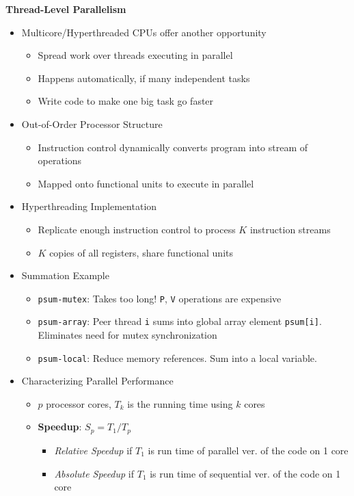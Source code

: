 \documentclass[12pt]{article}
\newcommand{\cname}[1]{\large \textbf{#1}}
\begin{document}
{\cname{Thread-Level Parallelism}
\begin{itemize}
	\item Multicore/Hyperthreaded CPUs offer another opportunity
	\begin{itemize}
		\item Spread work over threads executing in parallel
		\item Happens automatically, if many independent tasks
		\item Write code to make one big task go faster
	\end{itemize}
	\item Out-of-Order Processor Structure
	\begin{itemize}
		\item Instruction control dynamically converts program into stream of operations
		\item Mapped onto functional units to execute in parallel
	\end{itemize}
	\item Hyperthreading Implementation
	\begin{itemize}
		\item Replicate enough instruction control to process $K$ instruction streams
		\item $K$ copies of all registers, share functional units
	\end{itemize}
	\item Summation Example
	\begin{itemize}
		\item \texttt{psum-mutex}: Takes too long! \texttt{P}, \texttt{V} operations are expensive
		\item \texttt{psum-array}: Peer thread \texttt{i} sums into global array element \texttt{psum[i]}. Eliminates need for mutex synchronization
		\item \texttt{psum-local}: Reduce memory references. Sum into a local variable.
	\end{itemize}
	\item Characterizing Parallel Performance
	\begin{itemize}
		\item $p$ processor cores, $T_k$ is the running time using $k$ cores
		\item \textbf{Speedup}: $S_p = T_1 / T_p$
		\begin{itemize}
			\item \textit{Relative Speedup} if $T_1$ is run time of parallel ver. of the code on 1 core
			\item \textit{Absolute Speedup} if $T_1$ is run time of sequential ver. of the code on 1 core

\end{itemize}
\end{itemize}
\end{itemize}}
\end{document}
